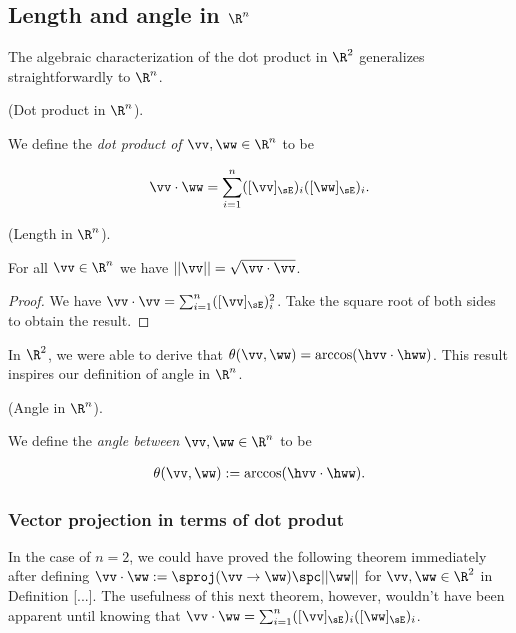 \subsection*{Length and angle in $\R^n$}

The algebraic characterization of the dot product in $\R^2$ generalizes straightforwardly to $\R^n$.

\begin{defn}
    (Dot product in $\R^n$).

    We define the \textit{dot product of $\vv, \ww \in \R^n$} to be

    \begin{align*}
        \vv \cdot \ww = \sum_{i = 1}^n ([\vv]_\sE)_i ([\ww]_\sE)_i.
    \end{align*}
\end{defn}

\begin{theorem}
    (Length in $\R^n$).

    For all $\vv \in \R^n$ we have $||\vv|| = \sqrt{\vv \cdot \vv}$.
\end{theorem}

\begin{proof}
    We have $\vv \cdot \vv = \sum_{i = 1}^n ([\vv]_\sE)_i^2$. Take the square root of both sides to obtain the result.
\end{proof}

In $\R^2$, we were able to derive that $\theta(\vv, \ww) = \arccos(\hvv \cdot \hww)$. This result inspires our definition of angle in $\R^n$.

\begin{defn}
    (Angle in $\R^n$). 
    
    We define the \textit{angle between $\vv, \ww \in \R^n$} to be

    \begin{align*}
        \theta(\vv, \ww) := \arccos(\hvv \cdot \hww).
    \end{align*}
\end{defn}

\subsubsection*{Vector projection in terms of dot produt}

In the case of $n = 2$, we could have proved the following theorem immediately after defining $\vv \cdot \ww := \sproj(\vv \rightarrow \ww) \spc ||\ww||$ for $\vv, \ww \in \R^2$ in Definition [...]. The usefulness of this next theorem, however, wouldn't have been apparent until knowing that $\vv \cdot \ww = \sum_{i = 1}^n ([\vv]_\sE)_i ([\ww]_\sE)_i$.

